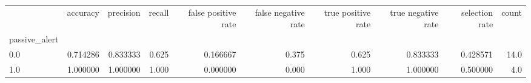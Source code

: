 \begin{tabular}{lrrrrrrrrr}
\toprule
{} &  accuracy &  precision &  recall &  false positive rate &  false negative rate &  true positive rate &  true negative rate &  selection rate &  count \\
passive\_alert &           &            &         &                      &                      &                     &                     &                 &        \\
\midrule
0.0           &  0.714286 &   0.833333 &   0.625 &             0.166667 &                0.375 &               0.625 &            0.833333 &        0.428571 &   14.0 \\
1.0           &  1.000000 &   1.000000 &   1.000 &             0.000000 &                0.000 &               1.000 &            1.000000 &        0.500000 &    4.0 \\
\bottomrule
\end{tabular}
